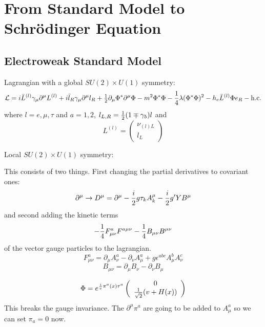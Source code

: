 \section{From Standard Model to Schr\"odinger Equation}

\subsection{Electroweak Standard Model}

Lagrangian with a global $SU(2)\times U(1)$ symmetry: 
\begin{equation*}
  {\mathcal L}=i\bar L^{(l)}\gamma_\mu\partial^\mu L^{(l)}+i\bar l_R \gamma_\mu\partial^\mu l_R +{\textstyle{1\over2}} \partial_\mu\Phi^*\partial^\mu\Phi-m^2\Phi^*\Phi-{1\over4} \lambda(\Phi^*\Phi)^2 -h_e\bar L^{(l)} \Phi e_R - \hbox{h.c.}
\end{equation*}
where $l=e,\mu,\tau$ and $a=1,2$, $l_{L,R} = {\textstyle{1\over2}} (1\mp\gamma_5)l$ and 
\begin{equation*}
  L^{(l)} = \left( \begin{array}{c} \nu_{(l)L} \\ l_L \end{array} \right)
\end{equation*}

Local $SU(2)\times U(1)$ symmetry:

This consists of two things. First changing the partial derivatives to covariant ones: 
\begin{equation*}
  \partial^\mu \to D^\mu =\partial^\mu-{i\over2}g\tau_k A_k^\mu - {i\over2}g'YB^\mu
\end{equation*}
and second adding the kinetic terms 
\begin{equation*}
  -{1\over4}F^a_{\mu\nu}F^{a\mu\nu}-{1\over4}B_{\mu\nu}B^{\mu\nu}
\end{equation*}
of the vector gauge particles to the lagrangian. 
\begin{equation*}
  F^a_{\mu\nu} = \partial_\mu A^a_\nu-\partial_\nu A^a_\mu+ g\epsilon^{abc}A^b_\mu A^c_\nu
\end{equation*}
\begin{equation*}
  B_{\mu\nu} = \partial_\mu B_\nu-\partial_\nu B_\mu
\end{equation*}

\begin{equation*}
  \Phi = e^{{i\over v}\pi^a(x)\tau^a} \left( \begin{array}{c} 0 \\ {1\over\sqrt{2}}(v+H(x)) \end{array} \right)
\end{equation*}
This breaks the gauge invariance. The $\partial^\mu\pi^a$ are going to be added to $A^a_\mu$ so we can set $\pi_a = 0$ now. 
